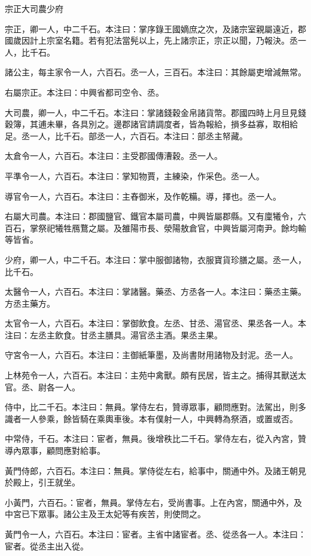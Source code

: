 
\begin{pinyinscope}
宗正大司農少府

宗正，卿一人，中二千石。本注曰：掌序錄王國嫡庶之次，及諸宗室親屬遠近，郡國歲因計上宗室名籍。若有犯法當髡以上，先上諸宗正，宗正以聞，乃報決。丞一人，比千石。

諸公主，每主家令一人，六百石。丞一人，三百石。本注曰：其餘屬吏增減無常。

右屬宗正。本注曰：中興省都司空令、丞。

大司農，卿一人，中二千石。本注曰：掌諸錢穀金帛諸貨幣。郡國四時上月旦見錢穀簿，其逋未畢，各具別之。邊郡諸官請調度者，皆為報給，損多益寡，取相給足。丞一人，比千石。部丞一人，六百石。本注曰：部丞主帑藏。

太倉令一人，六百石。本注曰：主受郡國傳漕穀。丞一人。

平準令一人，六百石。本注曰：掌知物賈，主練染，作采色。丞一人。

導官令一人，六百石。本注曰：主舂御米，及作乾糒。導，擇也。丞一人。

右屬大司農。本注曰：郡國鹽官、鐵官本屬司農，中興皆屬郡縣。又有廩犧令，六百石，掌祭祀犧牲鴈鶩之屬。及雒陽巿長、滎陽敖倉官，中興皆屬河南尹。餘均輸等皆省。

少府，卿一人，中二千石。本注曰：掌中服御諸物，衣服寶貨珍膳之屬。丞一人，比千石。

太醫令一人，六百石。本注曰：掌諸醫。藥丞、方丞各一人。本注曰：藥丞主藥。方丞主藥方。

太官令一人，六百石。本注曰：掌御飲食。左丞、甘丞、湯官丞、果丞各一人。本注曰：左丞主飲食。甘丞主膳具。湯官丞主酒。果丞主果。

守宮令一人，六百石。本注曰：主御紙筆墨，及尚書財用諸物及封泥。丞一人。

上林苑令一人，六百石。本注曰：主苑中禽獸。頗有民居，皆主之。捕得其獸送太官。丞、尉各一人。

侍中，比二千石。本注曰：無員。掌侍左右，贊導眾事，顧問應對。法駕出，則多識者一人參乘，餘皆騎在乘輿車後。本有僕射一人，中興轉為祭酒，或置或否。

中常侍，千石。本注曰：宦者，無員。後增秩比二千石。掌侍左右，從入內宮，贊導內眾事，顧問應對給事。

黃門侍郎，六百石。本注曰：無員。掌侍從左右，給事中，關通中外。及諸王朝見於殿上，引王就坐。

小黃門，六百石。：宦者，無員。掌侍左右，受尚書事。上在內宮，關通中外，及中宮已下眾事。諸公主及王太妃等有疾苦，則使問之。

黃門令一人，六百石。本注曰：宦者。主省中諸宦者。丞、從丞各一人。本注曰：宦者。從丞主出入從。


\end{pinyinscope}
